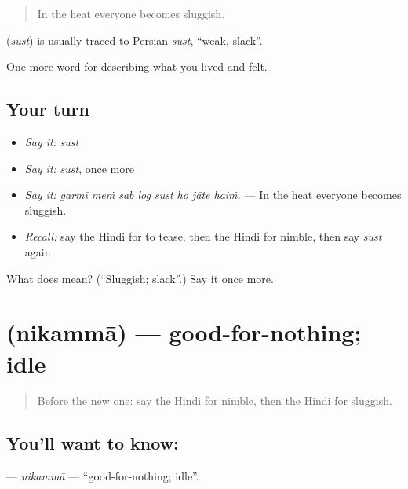 \begin{quote}
In the heat everyone becomes sluggish.
\end{quote}

\begin{cousinweb}
\textbf{} (\emph{sust}) is usually traced to Persian \emph{sust}, \textquotedblleft{}weak, slack\textquotedblright{}.
\end{cousinweb}

\begin{grammarlens}[title={What you've built}]
One more word for describing what you lived and felt.
\end{grammarlens}

\subsection*{Your turn}
\begin{itemize}
\raggedright
  \item \emph{Say it:} \emph{sust}
  \item \emph{Say it:} \emph{sust}, once more
  \item \emph{Say it:} \emph{garmī meṁ sab log sust ho jāte haiṁ.} — In the heat everyone becomes sluggish.
  \item \emph{Recall:} say the Hindi for to tease, then the Hindi for nimble, then say \emph{sust} again
\end{itemize}

\begin{tcolorbox}[breakable,colback=teal!4,colframe=teal!35!black,title={Before you move on}]
What does  mean? (\textquotedblleft{}Sluggish; slack\textquotedblright{}.) Say it once more.
\end{tcolorbox}
\section[\texorpdfstring{\hi{निकम्मा} (nikammā)}{निकम्मा (nikammā)}]{ (nikammā) — good-for-nothing; idle}

\label{lesson:HI-C472-nikamma}



\begin{quote}
Before the new one: say the Hindi for nimble, then the Hindi for sluggish.
\end{quote}

\subsection*{You'll want to know: }
\textbf{} — \emph{nikammā} — \textquotedblleft{}good-for-nothing; idle\textquotedblright{}.

